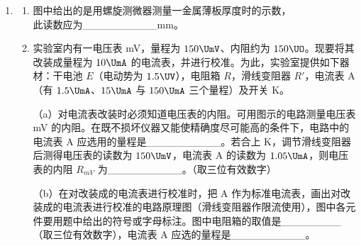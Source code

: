 \documentclass[\gkver]{gaokaozhenti}
\begin{document}
\begin{enumerate}
{	
}

\item
\begin{enumerate}
	\item
	图中给出的是用螺旋测微器测量一金属薄板厚度时的示数，\\ 此读数应为\_\_\_\_\_\_\_\_\_\_mm。

	\item
	实验室内有一电压表 mV，量程为 $150\UmV$、内阻约为 $150\UO$。现要将其改装成量程为 $10\UmA$ 的电流表，并进行校准。为此，实验室提供如下器材：干电池 $E$（电动势为 $1.5\UV$），电阻箱 $R$，滑线变阻器 $R'$，电流表 A（有 $1.5\UmA$、$15\UmA$ 与 $150\UmA$ 三个量程）及开关 K。

	（a）对电流表改装时必须知道电压表的内阻。可用图示的电路测量电压表 mV 的内阻。在既不损坏仪器又能使精确度尽可能高的条件下，电路中的电流表 A 应选用的量程是\_\_\_\_\_\_\_\_\_\_。若合上 K，调节滑线变阻器后测得电压表的读数为 $150\UmV$，电流表 A 的读数为 $1.05\UmA$，则电压表的内阻 $R_{mV}$ 为\_\_\_\_\_\_\_\_\_\_。（取三位有效数字）

	（b）在对改装成的电流表进行校准时，把 A 作为标准电流表，画出对改装成的电流表进行校准的电路原理图（滑线变阻器作限流使用），图中各元件要用题中给出的符号或字母标注。图中电阻箱的取值是\_\_\_\_\_\_\_\_（取三位有效数字），电流表 A 应选的量程是\_\_\_\_\_\_\_\_\_\_。
\end{enumerate}



\end{enumerate}
\end{document}
